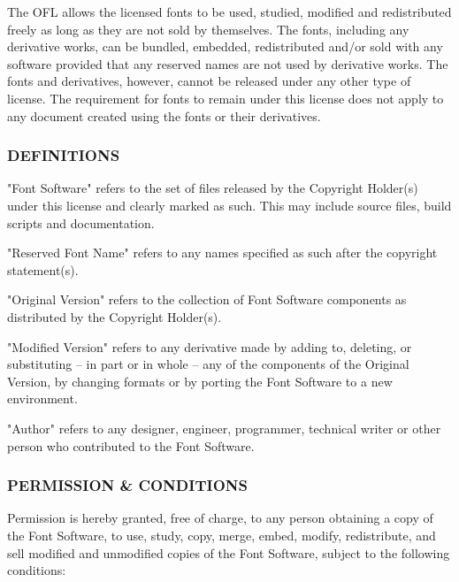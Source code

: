 \documentclass[a4paper]{article}
\begin{document}
The OFL allows the licensed fonts to be used, studied, modified and
redistributed freely as long as they are not sold by themselves. The
fonts, including any derivative works, can be bundled, embedded, 
redistributed and/or sold with any software provided that any reserved
names are not used by derivative works. The fonts and derivatives,
however, cannot be released under any other type of license. The
requirement for fonts to remain under this license does not apply
to any document created using the fonts or their derivatives.

\subsubsection*{DEFINITIONS}

"Font Software" refers to the set of files released by the Copyright
Holder(s) under this license and clearly marked as such. This may
include source files, build scripts and documentation.

"Reserved Font Name" refers to any names specified as such after the
copyright statement(s).

"Original Version" refers to the collection of Font Software components as
distributed by the Copyright Holder(s).

"Modified Version" refers to any derivative made by adding to, deleting,
or substituting -- in part or in whole -- any of the components of the
Original Version, by changing formats or by porting the Font Software to a
new environment.

"Author" refers to any designer, engineer, programmer, technical
writer or other person who contributed to the Font Software.

\subsubsection*{PERMISSION \& CONDITIONS}

Permission is hereby granted, free of charge, to any person obtaining
a copy of the Font Software, to use, study, copy, merge, embed, modify,
redistribute, and sell modified and unmodified copies of the Font
Software, subject to the following conditions:
\end{document}
